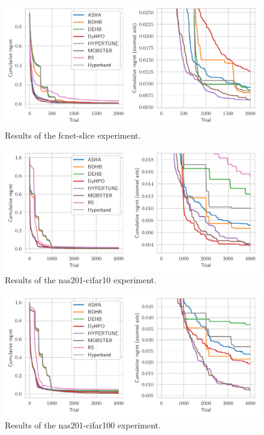 \begin{figure}[H]
    \centering
    \includegraphics[scale=0.65]{img/tabular_exp/fcnet-slice_plot.pdf}
    \caption{Results of the fcnet-slice experiment.}
\end{figure}




\begin{figure}[H]
    \centering
    \includegraphics[scale=0.65]{img/tabular_exp/nas201-cifar10_plot.pdf}
    \caption{Results of the nas201-cifar10 experiment.}
\end{figure}

\begin{figure}[H]
    \centering
    \includegraphics[scale=0.65]{img/tabular_exp/nas201-cifar100_plot.pdf}
    \caption{Results of the nas201-cifar100 experiment.}
\end{figure}

